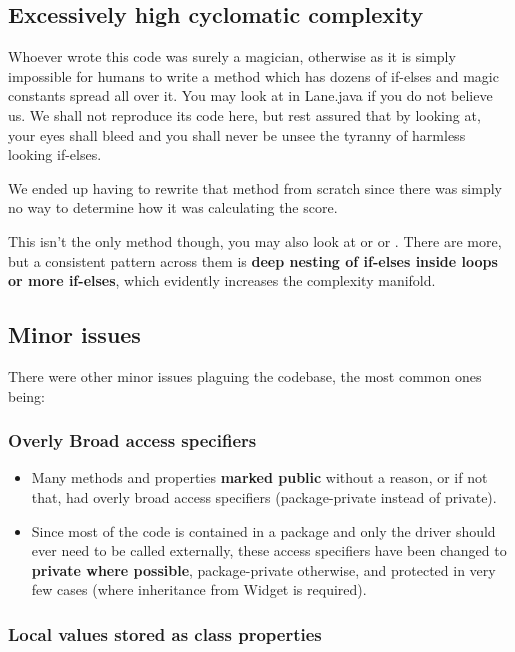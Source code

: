 \subsection{Excessively high cyclomatic complexity}

Whoever wrote this code was surely a magician, otherwise as it is simply impossible for humans to write a method which has dozens of if-elses and magic constants spread all over it. You may look at  in Lane.java if you do not believe us. We shall not reproduce its code here, but rest assured that by looking at, your eyes shall bleed and you shall never be unsee the tyranny of harmless looking if-elses.

We ended up having to rewrite that method from scratch since there was simply no way to determine how it was calculating the score.

This isn't the only method though, you may also look at  or  or . There are more, but a consistent pattern across them is \textbf{deep nesting of if-elses inside loops or more if-elses}, which evidently increases the complexity manifold.

\subsection{Minor issues}

There were other minor issues plaguing the codebase, the most common ones being:

\subsubsection{Overly Broad access specifiers}

\begin{itemize}

	\item Many methods and properties \textbf{marked public} without a reason, or if not that, had overly broad access specifiers (package-private instead of private).
	\item Since most of the code is contained in a package and only the driver should ever need to be called externally, these access specifiers have been changed to \textbf{private where possible}, package-private otherwise, and protected in very few cases (where inheritance from Widget is required).
\end{itemize}

\subsubsection{Local values stored as class properties}

